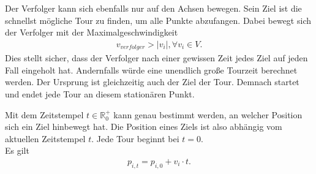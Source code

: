 \documentclass[german,version-2019-11]{uzl-thesis}
\begin{document}
\begin{definition}
Der Verfolger kann sich ebenfalls nur auf den Achsen bewegen. Sein Ziel ist die schnellst mögliche Tour zu finden, um alle Punkte abzufangen. Dabei bewegt sich der Verfolger mit der Maximalgeschwindigkeit 
\begin{align*}
v_{verfolger} > |v_i|, \forall v_i\in V.
\end{align*}
Dies stellt sicher, dass der Verfolger nach einer gewissen Zeit jedes Ziel auf jeden Fall eingeholt hat. Andernfalls würde eine unendlich große Tourzeit berechnet werden. Der Ursprung ist gleichzeitig auch der Ziel der Tour. Demnach startet und endet jede Tour an diesem stationären Punkt.
\end{definition}

\begin{definition}
\label{def:UpdatedPos}
Mit dem Zeitstempel $t\in \mathbb{R}^+_0$ kann genau bestimmt werden, an welcher Position sich ein Ziel hinbewegt hat. Die Position eines Ziels ist also abhängig vom aktuellen Zeitstempel $t$. Jede Tour beginnt bei $t=0$. \\
Es gilt
\begin{align*}
p_{i,t} = p_{i,0} + v_i\cdot t.
\end{align*} 
\end{definition}
\end{document}
